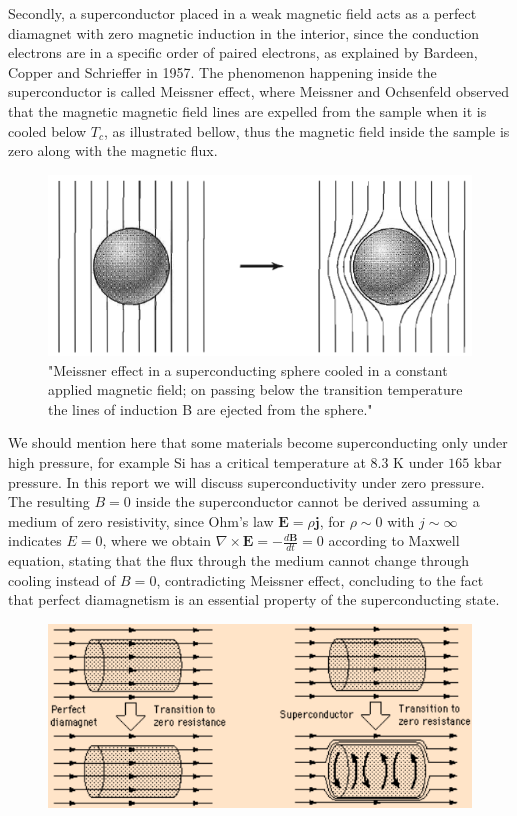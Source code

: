 \documentclass[openany,11pt,a4paper]{report}
\begin{document}
Secondly, a superconductor placed in a weak magnetic
field acts as a perfect diamagnet with zero magnetic induction in the interior,  since the conduction electrons are in a specific order of paired electrons, as  explained by Bardeen, Copper and Schrieffer in 1957. The phenomenon happening inside the superconductor is called Meissner effect, where Meissner and Ochsenfeld observed that the magnetic magnetic field lines are expelled from the sample when it is cooled below $T_{c}$, as illustrated bellow, thus the magnetic field inside the sample is zero along with the magnetic flux.


\begin{figure}[H]
\centering
\includegraphics[scale=.5]{Meissner.PNG}
\caption{"Meissner effect in a superconducting sphere cooled in a constant applied magnetic field;
on passing below the transition temperature the lines of induction B are ejected from the sphere."  \cite{kittel}}
\end{figure}

We should mention here that some materials become superconducting only under high pressure, for example Si has a critical temperature at $8.3$ K under $165$ kbar pressure. In this report we will discuss superconductivity  under zero pressure. The resulting $B = 0$ inside the superconductor cannot be derived assuming a medium of zero resistivity, since Ohm's law $\textbf{E} = \rho \textbf{j}$, for $\rho \sim 0$ with $j\sim \infty$ indicates $E=0$, where we obtain $\nabla \times \textbf{E}= -\frac{d \textbf{B}}{dt} =0$ according to Maxwell equation, stating that the flux through the medium cannot change through cooling instead of $B=0$, contradicting Meissner effect, concluding to the fact that perfect diamagnetism is an essential property of the  superconducting state.\\ 



\begin{figure}[H]
\centering
\includegraphics[scale=.9]{diam.PNG}
\caption{\cite{meis}}
\end{figure}
\end{document}
